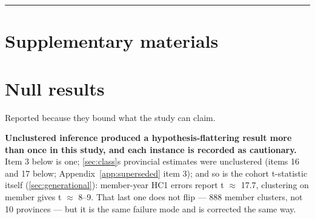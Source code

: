 \begin{center}\rule{0.5\linewidth}{0.5pt}\end{center}

\appendix
\section*{Supplementary materials}

\section{Null results}\label{app:null}

Reported because they bound what the study can claim.

\textbf{Unclustered inference produced a hypothesis-flattering result more than once
in this study, and each instance is recorded as cautionary.} Item 3 below is
one; \cref{sec:class}\textquotesingle s provincial estimates were unclustered (items 16 and 17 below;
Appendix~\ref{app:superseded} item 3); and so is the cohort t-statistic itself (\cref{sec:generational}): member-year
HC1 errors report t \(\approx\) 17.7, clustering on member gives t \(\approx\) 8--9. That last one
does not flip --- 888 member clusters, not 10 provinces --- but it is the same
failure mode and is corrected the same way.

